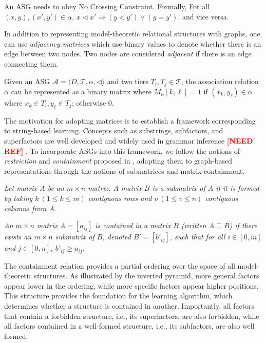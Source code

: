 \documentclass[pmlr]{jmlr}%
\newcommand{\refs}{%
    \textcolor{red}{\textbf{[NEED REF]}}%
    }
\begin{document}
\begin{definition}
	An ASG needs to obey No Crossing Constraint. Formally,
	For all $(x,y), (x',y') \in \alpha$,
	\(
	x \lhd x' \Rightarrow (y \lhd y') \vee (y = y').
	\) and vice versa.
\end{definition}


In addition to representing model-theoretic relational structures 
with graphs, one can use \textit{adjacency matrices} which use binary values to
denote whether there is an edge between two nodes. Two nodes
are considered \textit{adjacent} if there is an edge connecting
them. 
\begin{definition}
	Given an ASG $\mathcal{A} = \langle D, \mathcal{T}, \alpha, \lhd \rangle$
	and two tiers $T_i, T_j \in \mathcal{T}$, the association relation $\alpha$
	can be represented as a binary matrix where 
	$M_\alpha[k,\ell] = 1$ if $(x_k, y_\ell) \in \alpha$ where $x_k \in T_i, y_\ell \in T_j$; 
	otherwise $0$.
\end{definition}

The motivation for adopting matrices is to establish a framework
corresponding to string-based learning. Concepts such as substrings,
subfactors, and superfactors are well developed and widely used in
grammar inference \refs. To incorporate ASGs into this framework,
we follow the notions of \textit{restriction} and \textit{containment} 
proposed in \citet{chandleeBufia2019}, adapting them to graph-based
representations through the notions of submatrices and matrix
containment.

\begin{definition}
	\label{def.submatrix}
	\textit{
	Let matrix $A$ be an $m \times n$ matrix. A matrix $B$ is a
	\emph{submatrix} of $A$ if it is formed by taking
	$k \ (1 \leq k \leq m)$ contiguous rows and
	$v \ (1 \leq v \leq n)$ contiguous columns from $A$.
	}
\end{definition}

\begin{definition}[Containment]
\textit{
An $m \times n$ matrix $A=[a_{ij}]$ is contained
in a matrix $B$ (written $A \sqsubseteq B$) if there exists
an $m \times n$ submatrix of $B$, denoted $B'=[b'_{ij}]$,
such that for all $i \in [0,m]$ and $j \in [0,n]$,
$b'_{ij} \geq a_{ij}$.
}
\end{definition}

The containment relation provides a partial ordering over the
space of all model-theoretic structures. As illustrated by the
inverted pyramid, more general factors appear lower in the
ordering, while more specific factors appear higher positions.
This structure provides the foundation for the learning algorithm,
which determines whether a structure is contained in another.
Importantly, all factors that contain a forbidden structure, 
i.e., its superfactors, are also forbidden, while all factors 
contained in a well-formed structure, i.e., its subfactors, 
are also well formed.
\end{document}
